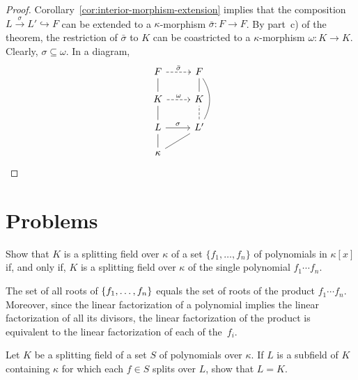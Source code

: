 \begin{proof}
    Corollary~\ref{cor:interior-morphism-extension} implies that the composition $L\stackrel\sigma\to L'\hookrightarrow F$ can be extended to a $\kappa$-morphism $\bar\sigma\colon F\to F$. By part~c) of the theorem, the restriction of $\bar\sigma$ to $K$ can be coastricted to a $\kappa$-morphism $\omega\colon K\to K$. Clearly, $\sigma\subseteq\omega$. In a diagram,
    \small
    $$
        \begin{tikzcd}[row sep=0.5cm]
            F
                    \arrow[r,dashed,"\bar\sigma"]
                &F\\
            K
                    \arrow[r,dashed, "\omega"]
                    \arrow[u,no head]
                &K
                    \arrow[u,no head]\\
            L
                    \arrow[r,"\sigma"]
                    \arrow[u,no head]
                &L'
                    \arrow[u,no head,dashed]
                    \arrow[uu,no head,bend right]\\
            \kappa
                    \arrow[u,no head]
                    \arrow[ur,no head]
        \end{tikzcd}    
    $$
    \normalsize
\end{proof}


\section{Problems}

\begin{probl}
    Show that\/ $K$ is a splitting field over\/ $\kappa$ of a set\/ $\{f_1,\dots,f_n\}$ of polynomials in\/ $\kappa[x]$ if, and only if, $K$ is a splitting field over\/ $\kappa$ of the single polynomial\/ $f_1\cdots f_n$.
\end{probl}

\begin{solution}
    The set of all roots of $\{f_1,\dots,f_n\}$ equals the set of roots of the product $f_1\cdots f_n$. Moreover, since the linear factorization of a polynomial implies the linear factorization of all its divisors, the linear factorization of the product is equivalent to the linear factorization of each of the~$f_i$.
\end{solution}


\begin{probl}
    Let\/ $K$ be a splitting field of a set\/ $S$ of polynomials over\/ $\kappa$. If\/ $L$ is a subfield of\/ $K$ containing\/ $\kappa$ for which each\/ $f \in S$ splits over\/ $L$, show that\/ $L = K$.
\end{probl}

